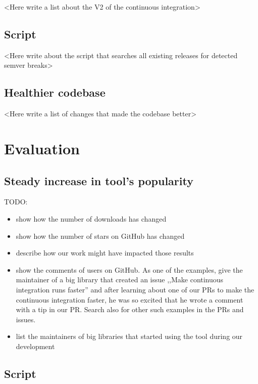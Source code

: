 \documentclass[licencjacka,en]{pracamgr}
\begin{document}
<Here write a list about the V2 of the continuous integration>

\section{Script}

<Here write about the script that searches all existing releases for detected semver breaks>

\section{Healthier codebase}

<Here write a list of changes that made the codebase better>

\chapter{Evaluation}\label{r:chapter_evaluation}

\section{Steady increase in tool's popularity}

TODO:
\begin{itemize}
	\item show how the number of downloads has changed
	\item show how the number of stars on GitHub has changed
	\item describe how our work might have impacted those results
	\item show the comments of users on GitHub.
		As one of the examples, give the maintainer of a big
		library that created an issue ,,Make continuous integration runs faster''
		and after learning about one of our PRs to make the continuous integration faster,
		he was so excited that he wrote a comment with a tip in our PR.
		Search also for other such examples in the PRs and issues.
	\item list the maintainers of big libraries that started using the tool during our development
\end{itemize}

\section{Script} \label{r:section_scanning_script}
\end{document}
